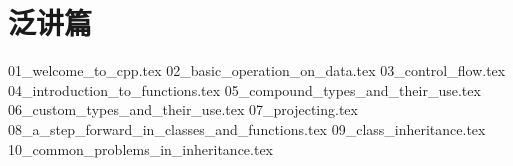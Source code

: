 \part*{泛讲篇}
{01_welcome_to_cpp.tex}
{02_basic_operation_on_data.tex}
{03_control_flow.tex}
{04_introduction_to_functions.tex}
{05_compound_types_and_their_use.tex}
{06_custom_types_and_their_use.tex}
{07_projecting.tex}
{08_a_step_forward_in_classes_and_functions.tex}
{09_class_inheritance.tex}
{10_common_problems_in_inheritance.tex}